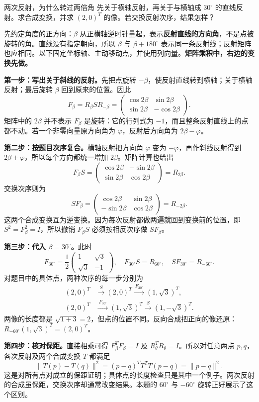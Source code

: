 \begin{example}{两次反射，为什么转过两倍角}
先关于横轴反射，再关于与横轴成 \(30^\circ\) 的直线反射。求合成变换，并求 \((2,0)^T\) 的像。若交换反射次序，结果怎样？
\end{example}
\begin{solution}
先约定角度的正方向：\(\beta\) 从正横轴逆时针量起，表示\textbf{反射直线的方向角}，不是点被旋转的角。直线没有指定朝向，所以 \(\beta\) 与 \(\beta+180^\circ\) 表示同一条反射线；反射矩阵也应相同。以下固定坐标轴、主动移动点，并使用列向量。\textbf{矩阵乘积中，右边的变换先做。}

\textbf{第一步：写出关于斜线的反射。}先把点旋转 \(-\beta\)，使反射直线转到横轴；关于横轴反射；最后旋转 \(\beta\) 回到原来的位置。因此
\[
 F_\beta=R_\beta S R_{-\beta}
 =\begin{pmatrix}
 \cos 2\beta&\sin 2\beta\\
 \sin 2\beta&-\cos 2\beta
 \end{pmatrix}.
\]
矩阵中的 \(2\beta\) 并不表示 \(F_\beta\) 是旋转：它的行列式为 \(-1\)，而且整条反射直线上的点都不动。若一个非零向量原方向角为 \(\varphi\)，反射后方向角为 \(2\beta-\varphi\)。

\textbf{第二步：按题目次序复合。}横轴反射把方向角 \(\varphi\) 变为 \(-\varphi\)，再作斜线反射得到 \(2\beta+\varphi\)，所以每个方向都统一增加 \(2\beta\)。矩阵计算也给出
\[
 F_\beta S
 =\begin{pmatrix}
 \cos 2\beta&-\sin 2\beta\\
 \sin 2\beta&\cos 2\beta
 \end{pmatrix}
 =R_{2\beta}.
\]
交换次序则为
\[
 SF_\beta
 =\begin{pmatrix}
 \cos 2\beta&\sin 2\beta\\
 -\sin 2\beta&\cos 2\beta
 \end{pmatrix}
 =R_{-2\beta}.
\]
这两个合成变换互为逆变换。因为每次反射都做两遍就回到变换前的位置，即 \(S^2=F_\beta^2=I\)，所以撤销 \(F_\beta S\) 必须按相反次序做 \(SF_\beta\)。

\textbf{第三步：代入 \(\beta=30^\circ\)。}此时
\[
 F_{30^\circ}=\frac12\begin{pmatrix}1&\sqrt3\\\sqrt3&-1\end{pmatrix},
 \quad F_{30^\circ}S=R_{60^\circ},
 \quad SF_{30^\circ}=R_{-60^\circ}.
\]
对题目中的具体点，两种次序的每一步分别为
\begin{align*}
 (2,0)^T&\xrightarrow{\ S\ }(2,0)^T
          \xrightarrow{\ F_{30^\circ}\ }(1,\sqrt3)^T,\\
 (2,0)^T&\xrightarrow{\ F_{30^\circ}\ }(1,\sqrt3)^T
          \xrightarrow{\ S\ }(1,-\sqrt3)^T.
\end{align*}
两像的长度都是 \(\sqrt{1+3}=2\)，但点的位置不同。反向合成把正向的像还原：\(R_{-60^\circ}(1,\sqrt3)^T=(2,0)^T\)。

\textbf{第四步：核对保距。}直接相乘可得 \(F_\beta^TF_\beta=I\) 及 \(R_\theta^TR_\theta=I\)。所以对任意两点 \(p,q\)，各次反射及两个合成变换 \(T\) 都满足
\[
 \|T(p)-T(q)\|^2
 =(p-q)^TT^TT(p-q)=\|p-q\|^2.
\]
这是对所有点对成立的保距证明；具体点的长度检查只是其中一个例子。两次反射的合成虽保距，交换次序却通常改变结果。本题的 \(60^\circ\) 与 \(-60^\circ\) 旋转正好展示了这个区别。
\end{solution}

